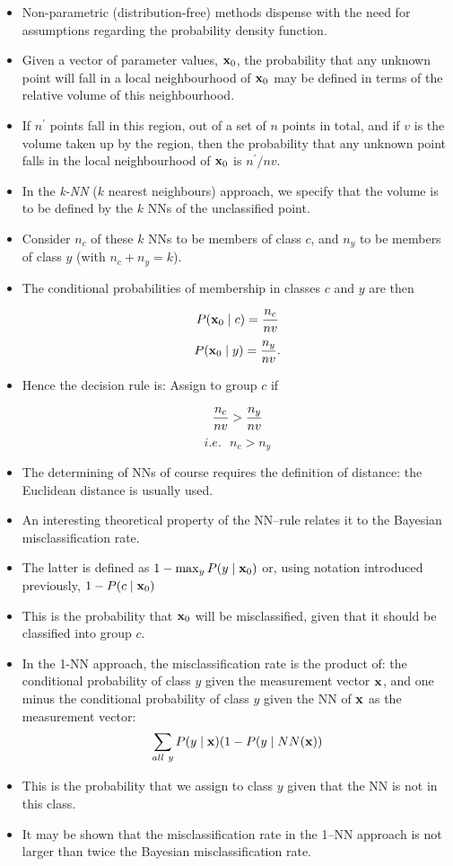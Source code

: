 \documentclass[a4,dvips]{seminar}
\newcommand{\heading}[1]{%
  \begin{center}
    \large\bf
    \shadowbox{#1}%
  \end{center}
  \vspace{1ex minus 1ex}}
\begin{document}
\begin{slide}
\textcolor {reddish} {\heading{Non-Parametric Discrimination}}
\begin{itemize}
\item Non-parametric (distribution-free) methods dispense with the need for
assumptions regarding the probability density function.  
\item Given a vector of parameter values, ${\bf x}_0$, the probability that any
unknown point will fall in a local neighbourhood of ${\bf x}_0$ may
be defined in terms of the relative volume of this neighbourhood.  
\item If
$n^\prime$ points fall in this region, out of a set of $n$ points in
total, and if $v$ is the volume taken up by the region, then the
probability that any unknown point falls in the local neighbourhood of
${\bf x}_0$ is ${ n^\prime / {nv} }$.  
\item 
In the {\sl k-NN} ($k$ nearest neighbours) approach, we specify that the
volume is to be defined by the $k$ NNs of the unclassified point.  
\item Consider
$n_c$ of these $k$ NNs to be members of class $c$, and $n_y$ to be 
members of class $y$ (with $n_c + n_y = k$).  
\item The conditional probabilities
of membership in classes $c$ and $y$ are then

$$ P({\bf x}_0 \mid c) = {n_c \over {nv} } $$
$$ P({\bf x}_0 \mid y) = {n_y \over {nv} } . $$

\item Hence the decision rule is: Assign to group $c$ if

$$ {n_c \over {nv} } > {n_y \over {nv} } $$
$$ i.e.  \ \ \  n_c > n_y   $$

\item The determining of NNs of course requires the definition of distance: the
Euclidean distance is usually used.
\item An interesting theoretical property of the NN--rule relates it to the
Bayesian misclassification rate.  
\item The latter is defined as
$ 1 - \max_y P(y \mid {\bf x}_0)  $ or,
using notation introduced previously, $1 - P(c \mid {\bf x}_0)$
\item This is the probability that ${\bf x}_0$ will be misclassified, given
that it should be classified into group $c$.
\item In the 1-NN approach, the misclassification rate is the product of:
the conditional probability of class $y$ given the measurement 
vector ${\bf x}$, and one minus the conditional probability of 
class $y$ given the NN of ${\bf x}$ as the measurement vector:
$$ \sum_{all \ y} P(y \mid {\bf x}) (1 - P(y \mid NN({\bf x})) $$
\item This is the probability that we assign to class $y$ given that
the NN is not in this class. 
\item  It may be shown that the misclassification
rate in the 1--NN approach  is not larger than
twice the Bayesian misclassification rate.
\end{itemize}
\end{slide}
\end{document}
